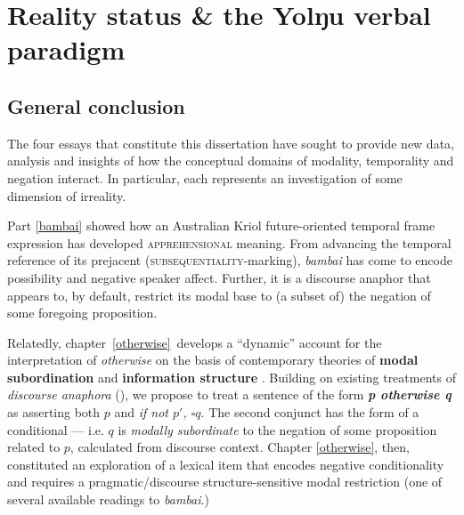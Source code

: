 \documentclass[12pt,dvipsnames]{report}
\newcommand{\mcom}[1]
{\marginpar{\color{black}\raggedleft\raggedright\hspace{0pt}\linespread{0.9}\footnotesize{#1}}}
\begin{document}
		\upshape 
\fi


\part{Reality status \& the Yolŋu verbal paradigm}\label{yolŋu}
%


%

\chapter*{General conclusion}



The four essays that constitute this dissertation have sought to provide new data, analysis and insights of how the conceptual domains of modality, temporality and negation interact. In particular, each represents an investigation of some dimension of irreality.

Part \ref{bambai} showed how an Australian Kriol future-oriented temporal frame expression has developed \textsc{apprehensional} meaning. From advancing the temporal reference of its prejacent (\textsc{subsequentiality}-marking), \textit{bambai} has come to encode possibility and negative speaker affect. Further, it is a discourse anaphor that appears to, by default, restrict its modal base to (a subset of) the negation of some foregoing proposition.

Relatedly, chapter~\ref{otherwise}~develops a ``dynamic'' account for the interpretation of \textit{otherwise} on the basis of contemporary theories of \textbf{modal subordination} \citep{Roberts1989,Roberts2020,Roberts1995} and \textbf{information structure} \citep[e.g.][]{Roberts2012}. Building on existing treatments of \textit{discourse anaphora} (\citet{Webber2001,Kruijff-Korbayova2001}), we propose to treat a sentence of the form \textbf{\textit{p otherwise q}} as asserting both $ p $ and \textit{if not $ p' $, $ \square q $}. The second conjunct has the form of a conditional --- i.e. $ q $ is \textit{modally subordinate} to the negation of some proposition related to $ p $, calculated from discourse context. Chapter \ref{otherwise}, then, constituted an exploration of a lexical item that encodes negative conditionality and requires a pragmatic/discourse structure-sensitive modal restriction (one of several available readings to \textit{bambai}.)
\end{document}
